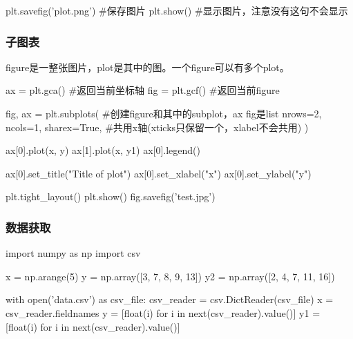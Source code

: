 \begin{codeblock}[language=python, caption={basic setup of plt}]
        plt.savefig('plot.png') #保存图片
        plt.show() #显示图片，注意没有这句不会显示
      \end{codeblock}

    \subsubsection{子图表}
      figure是一整张图片，plot是其中的图。一个figure可以有多个plot。
      \begin{codeblock}[language=python, caption={subplot}]
        ax = plt.gca() #返回当前坐标轴
        fig = plt.gcf() #返回当前figure

        fig, ax = plt.subplots( #创建figure和其中的subplot，ax fig是list
            nrows=2, ncols=1,
            sharex=True, #共用x轴(xticks只保留一个，xlabel不会共用)
        ) 

        ax[0].plot(x, y)
        ax[1].plot(x, y1)
        ax[0].legend()

        ax[0].set_title("Title of plot")
        ax[0].set_xlabel("x")
        ax[0].set_ylabel("y")

        plt.tight_layout()
        plt.show()
        fig.savefig('test.jpg')
      \end{codeblock}

    \subsubsection{数据获取}
      \begin{codeblock}[language=python, caption={fetch data}]
        import numpy as np
        import csv

        x = np.arange(5)
        y = np.array([3, 7, 8, 9, 13])
        y2 = np.array([2, 4, 7, 11, 16])

        with open('data.csv') as csv_file:
            csv_reader = csv.DictReader(csv_file)
            x = csv_reader.fieldnames
            y = [float(i) for i in next(csv_reader).value()]
            y1 = [float(i) for i in next(csv_reader).value()]
      \end{codeblock}

